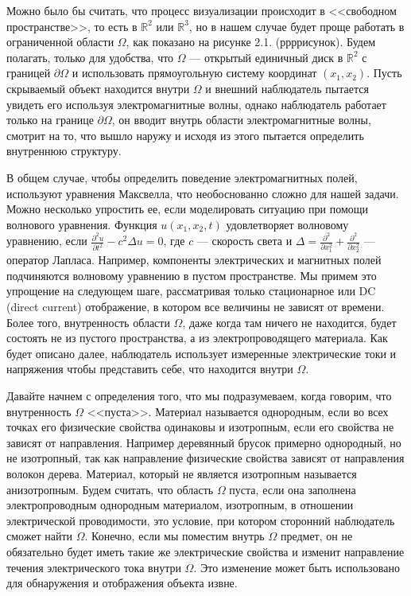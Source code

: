 \documentclass[a4paper, 12pt]{article}
\begin{document}
Можно было бы считать, что процесс визуализации происходит в <<свободном пространстве>>, то есть в $\mathbb{R}^2$ или $\mathbb{R}^3$, но в нашем случае будет проще работать в ограниченной области $\Omega$, как показано на рисунке 2.1. (ррррисунок). Будем полагать, только для удобства, что $\Omega$ --- открытый единичный диск в $\mathbb{R}^2$ с границей $\partial \Omega$ и использовать прямоугольную систему координат $(x_1, x_2)$. Пусть скрываемый объект находится внутри $\Omega$ и внешний наблюдатель пытается увидеть его используя электромагнитные волны, однако наблюдатель работает только на границе $\partial \Omega$, он вводит внутрь области электромагнитные волны, смотрит на то, что вышло наружу и исходя из этого пытается определить внутреннюю структуру.


В общем случае, чтобы определить поведение электромагнитных полей, используют уравнения Максвелла, что необоснованно сложно для нашей задачи. Можно несколько упростить ее, если моделировать ситуацию при помощи волнового уравнения. Функция $u(x_1, x_2, t)$ удовлетворяет волновому уравнению, если $\frac{\partial^2 u}{\partial t^2} - c^2 \Delta u = 0$, где $c$ --- скорость света и $\Delta = \frac{\partial^2}{\partial x_1^2} + \frac{\partial^2}{\partial x_2^2}$ --- оператор Лапласа. Например, компоненты электрических и магнитных полей подчиняются волновому уравнению в пустом пространстве. Мы примем это упрощение на следующем шаге, рассматривая только стационарное или DC (direct current) отображение, в котором все величины не зависят от времени. Более того, внутренность области $\Omega$, даже когда там ничего не находится, будет состоять не из пустого пространства, а из электропроводящего материала. Как будет описано далее, наблюдатель использует измеренные электрические токи и напряжения чтобы представить себе, что находится внутри $\Omega$.


Давайте начнем с определения того, что мы подразумеваем, когда говорим, что внутренность $\Omega$ <<пуста>>. Материал называется однородным, если во всех точках его физические свойства одинаковы и изотропным, если его свойства не зависят от направления. Например деревянный брусок примерно однородный, но не изотропный, так как направление физические свойства зависят от направления волокон дерева. Материал, который не является изотропным называется анизотропным. Будем считать, что область $\Omega$ пуста, если она заполнена электропроводным однородным материалом, изотропным, в отношении электрической проводимости, это условие, при котором сторонний наблюдатель сможет найти $\Omega$. Конечно, если мы поместим внутрь $\Omega$ предмет, он не обязательно будет иметь такие же электрические свойства и изменит направление течения электрического тока внутри $\Omega$. Это изменение может быть использовано для обнаружения и отображения объекта извне.
\end{document}
